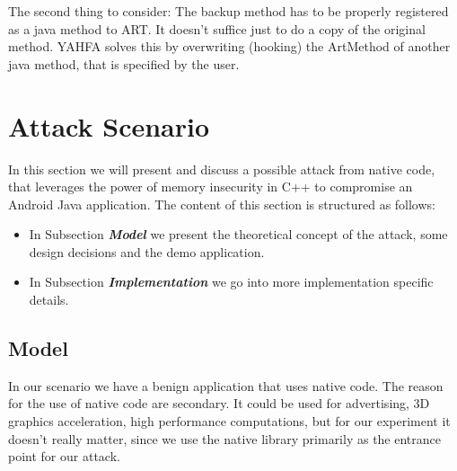 The second thing to consider: The backup method has to be properly registered as a java method to ART. It doesn't suffice just to do a copy of the original method. YAHFA solves this by overwriting (hooking) the ArtMethod of another java method, that is specified by the user.


\section{Attack Scenario}
In this section we will present and discuss a possible attack from native code, that leverages the power of memory insecurity in C++ to compromise an Android Java application. The content of this section is structured as follows:
\begin{itemize}
\item In Subsection \emph{\textbf{Model}} we present the theoretical concept of the attack, some design decisions and the demo application.
\item In Subsection \emph{\textbf{Implementation}} we go into more implementation specific details. %
\end{itemize}
 

\subsection{Model}

In our scenario we have a benign application that uses native code.
The reason for the use of native code are secondary. It could be used for advertising, 3D graphics acceleration, high performance computations, but for our experiment it doesn't really matter, since we use the native library primarily as the entrance point for our attack.

